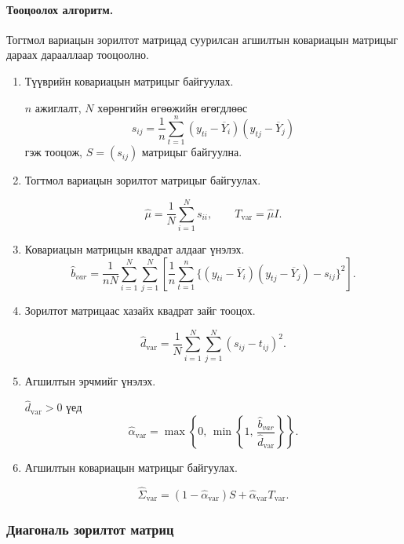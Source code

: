 \paragraph{Тооцоолох алгоритм.}

Тогтмол вариацын зорилтот матрицад суурилсан
агшилтын ковариацын матрицыг дараах
дарааллаар тооцоолно.

\begin{enumerate}
	\item Түүврийн ковариацын матрицыг байгуулах.
	
	$n$ ажиглалт, $N$ хөрөнгийн өгөөжийн
	өгөгдлөөс
	\[
	s_{ij}
	=
	\frac{1}{n}
	\sum_{t=1}^{n}
	(y_{ti}-\overline{Y}_i)
	(y_{tj}-\overline{Y}_j)
	\]
	гэж тооцож, $S=(s_{ij})$ матрицыг байгуулна.
	
	\item Тогтмол вариацын зорилтот
	матрицыг байгуулах.
	
	\[
	\widehat{\mu}
	=
	\frac{1}{N}\sum_{i=1}^{N}s_{ii},
	\qquad
	T_{\mathrm{var}}=\widehat{\mu}I.
	\]
	
	\item Ковариацын матрицын
	квадрат алдааг үнэлэх.
	\[
	\widehat{b}_{var}
	=
	\frac{1}{nN}
	\sum_{i=1}^{N}\sum_{j=1}^{N}
	\left[
	\frac{1}{n}
	\sum_{t=1}^{n}
	\{(y_{ti}-\overline{Y}_i)
	(y_{tj}-\overline{Y}_j)-s_{ij}\}^2
	\right].
	\]
	
	\item Зорилтот матрицаас хазайх
	квадрат зайг тооцох.
	
	\[
	\widehat{d}_{\mathrm{var}}
	=
	\frac{1}{N}
	\sum_{i=1}^{N}\sum_{j=1}^{N}
	(s_{ij}-t_{ij})^2.
	\]
	
	\item Агшилтын эрчмийг үнэлэх.
	
	$\widehat{d}_{\mathrm{var}}>0$
	үед
	\[
	\widehat{\alpha}_{\mathrm{var}}
	=
	\max\left\{
	0,\,
	\min\left\{
	1,\,
	\frac{\widehat{b}_{var}}
	{\widehat{d}_{\mathrm{var}}}
	\right\}
	\right\}.
	\]
	
	\item Агшилтын ковариацын
	матрицыг байгуулах.
	
	\[
	\boxed{
		\widehat{\Sigma}_{\mathrm{var}}
		=
		(1-\widehat{\alpha}_{\mathrm{var}})S
		+
		\widehat{\alpha}_{\mathrm{var}}
		T_{\mathrm{var}}
	}.
	\]
\end{enumerate}

\subsubsection{Диагональ зорилтот матриц}

